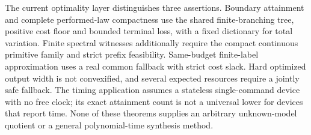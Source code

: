 The current optimality layer distinguishes three assertions. Boundary attainment and complete performed-law compactness use the shared finite-branching tree, positive cost floor and bounded terminal loss, with a fixed dictionary for total variation. Finite spectral witnesses additionally require the compact continuous primitive family and strict prefix feasibility. Same-budget finite-label approximation uses a real common fallback with strict cost slack. Hard optimized output width is not convexified, and several expected resources require a jointly safe fallback. The timing application assumes a stateless single-command device with no free clock; its exact attainment count is not a universal lower for devices that report time. None of these theorems supplies an arbitrary unknown-model quotient or a general polynomial-time synthesis method.
